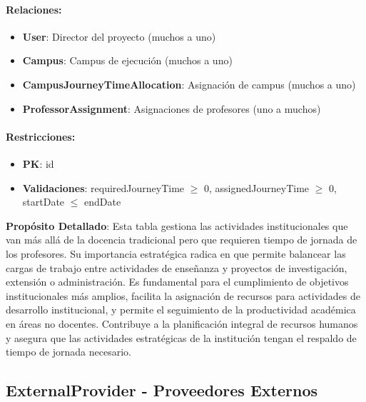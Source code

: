 \documentclass[11pt,a4paper]{article}
\begin{document}
\paragraph{Relaciones:}
\begin{itemize}
    \item \textbf{User}: Director del proyecto (muchos a uno)
    \item \textbf{Campus}: Campus de ejecución (muchos a uno)
    \item \textbf{CampusJourneyTimeAllocation}: Asignación de campus (muchos a uno)
    \item \textbf{ProfessorAssignment}: Asignaciones de profesores (uno a muchos)
\end{itemize}

\paragraph{Restricciones:}
\begin{itemize}
    \item \textbf{PK}: id
    \item \textbf{Validaciones}: requiredJourneyTime $\geq$ 0, assignedJourneyTime $\geq$ 0, startDate $\leq$ endDate
\end{itemize}

\vspace{0.5cm}

\textbf{Propósito Detallado}: Esta tabla gestiona las actividades institucionales que van más allá de la docencia tradicional pero que requieren tiempo de jornada de los profesores. Su importancia estratégica radica en que permite balancear las cargas de trabajo entre actividades de enseñanza y proyectos de investigación, extensión o administración. Es fundamental para el cumplimiento de objetivos institucionales más amplios, facilita la asignación de recursos para actividades de desarrollo institucional, y permite el seguimiento de la productividad académica en áreas no docentes. Contribuye a la planificación integral de recursos humanos y asegura que las actividades estratégicas de la institución tengan el respaldo de tiempo de jornada necesario.

{\color{darkblue}\Large\subsection{ExternalProvider - Proveedores Externos}}
\end{document}
